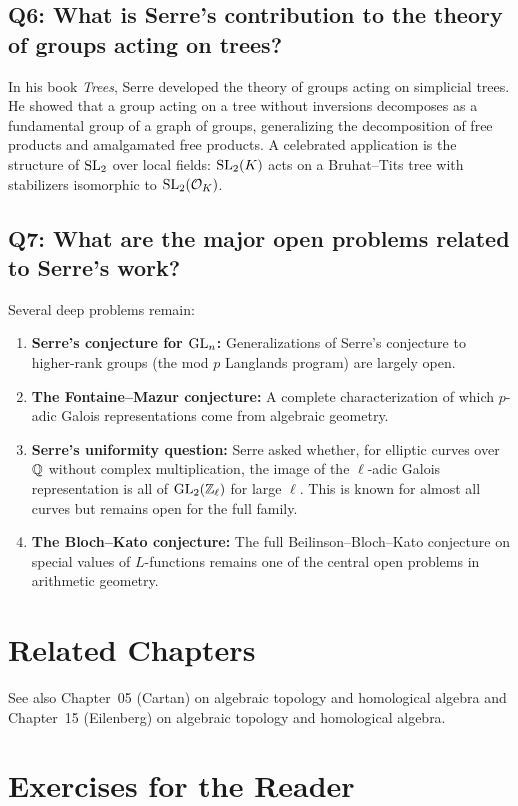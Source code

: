 \subsection*{Q6: What is Serre's contribution to the theory of groups acting on trees?}
In his book \textit{Trees}, Serre developed the theory of groups acting on simplicial trees. He showed that a group acting on a tree without inversions decomposes as a fundamental group of a graph of groups, generalizing the decomposition of free products and amalgamated free products. A celebrated application is the structure of \(\operatorname{SL}_2\) over local fields: \(\operatorname{SL}_2(K)\) acts on a Bruhat--Tits tree with stabilizers isomorphic to \(\operatorname{SL}_2(\mathcal{O}_K)\).

\subsection*{Q7: What are the major open problems related to Serre's work?}
Several deep problems remain:
\begin{enumerate}
    \item \textbf{Serre's conjecture for \(\operatorname{GL}_n\):} Generalizations of Serre's conjecture to higher-rank groups (the mod \(p\) Langlands program) are largely open.
    \item \textbf{The Fontaine--Mazur conjecture:} A complete characterization of which \(p\)-adic Galois representations come from algebraic geometry.
    \item \textbf{Serre's uniformity question:} Serre asked whether, for elliptic curves over \(\mathbb{Q}\) without complex multiplication, the image of the \(\ell\)-adic Galois representation is all of \(\operatorname{GL}_2(\mathbb{Z}_\ell)\) for large \(\ell\). This is known for almost all curves but remains open for the full family.
    \item \textbf{The Bloch--Kato conjecture:} The full Beilinson--Bloch--Kato conjecture on special values of \(L\)-functions remains one of the central open problems in arithmetic geometry.
\end{enumerate}

\section{Related Chapters}
See also Chapter~05 (Cartan) on algebraic topology and homological algebra and Chapter~15 (Eilenberg) on algebraic topology and homological algebra.

\section*{Exercises for the Reader}

